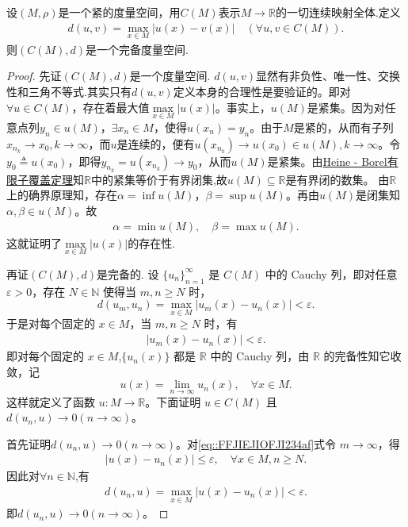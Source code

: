 \documentclass[../../main.tex]{subfiles}%
\begin{document}
\begin{theorem}\label{theorem:CMd是一个完备度量空间}
设$(M,\rho)$是一个紧的度量空间，用$C(M)$表示$M\to\mathbb{R}$的一切连续映射全体.定义
\begin{align*}
d(u,v)=\max\limits_{x\in M}|u(x)-v(x)|\quad (\forall u,v\in C(M)).
\end{align*}
则$(C(M),d)$是一个完备度量空间.
\end{theorem}
\begin{proof}
先证$(C(M),d)$是一个度量空间.
$d(u,v)$显然有非负性、唯一性、交换性和三角不等式.其实只有$d(u,v)$定义本身的合理性是要验证的。即对$\forall u\in C(M)$，存在着最大值$\max\limits_{x\in M}|u(x)|$。事实上，$u(M)$是紧集。因为对任意点列$y_n\in u(M)$，$\exists x_n\in M$，使得$u(x_n)=y_n$。由于$M$是紧的，从而有子列$x_{n_k}\to x_0,k\to\infty$，而$u$是连续的，便有$u(x_{n_k})\to u(x_0)\in u(M),k\to\infty$。令$y_0\triangleq u(x_0)$，即得$y_{n_k}=u(x_{n_k})\to y_0$，从而$u(M)$是紧集。由\hyperref[Real Analysis-theorem:Heine - Borel有限子覆盖定理]{Heine - Borel有限子覆盖定理}知$\mathbb{R}$中的紧集等价于有界闭集,故$u(M)\subseteq \mathbb{R}$是有界闭的数集。
由$\mathbb{R}$上的确界原理知，存在$\alpha=\inf u(M)$，$\beta=\sup u(M)$。再由$u(M)$是闭集知$\alpha,\beta\in u(M)$。故
\begin{align*}
\alpha=\min u(M),\quad \beta=\max u(M).
\end{align*}
这就证明了$\max\limits_{x\in M}|u(x)|$的存在性.

再证$(C(M),d)$是完备的.
设 $\{u_n\}_{n=1}^\infty$ 是 $C(M)$ 中的 Cauchy 列，即对任意 $\varepsilon>0$，存在 $N\in\mathbb{N}$ 使得当 $m,n\geqslant N$ 时，
\[
d(u_m,u_n)=\max_{x\in M}|u_m(x)-u_n(x)|<\varepsilon.
\]
于是对每个固定的 $x\in M$，当 $m,n\geqslant N$ 时，有
\begin{align}\label{eq::FFJIEJIOFJI234af}
|u_m(x)-u_n(x)|<\varepsilon.
\end{align}
即对每个固定的 $x\in M$,$\{u_n(x)\}$ 都是 $\mathbb{R}$ 中的 Cauchy 列，由 $\mathbb{R}$ 的完备性知它收敛，记
\[
u(x)=\lim_{n\to\infty}u_n(x),\quad \forall x\in M.
\]
这样就定义了函数 $u:M\to\mathbb{R}$。下面证明 $u\in C(M)$ 且 $d(u_n,u)\to0(n\to \infty)$。

首先证明$d(u_n,u)\to0(n\to \infty)$。对\eqref{eq::FFJIEJIOFJI234af}式令 $m\to\infty$，得
\begin{align}\label{eq::hiufh3FIOUEJO}
|u(x)-u_n(x)|\leqslant \varepsilon,\quad \forall x\in M,n\geqslant N.
\end{align}
因此对$\forall n\in \mathbb{N}$,有
\begin{align*}
d(u_n,u)=\max_{x\in M}|u(x)-u_n(x)|<\varepsilon.
\end{align*}
即$d(u_n,u)\to0(n\to \infty)$。


\end{proof}
\end{document}
